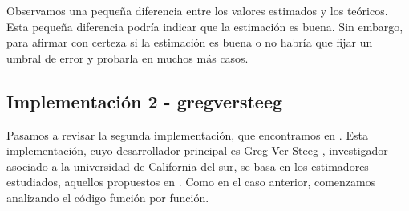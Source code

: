 \documentclass[12pt,a4paper]{report} %
\theoremstyle{definition}
\begin{document}
Observamos una pequeña diferencia entre los valores estimados y los teóricos. Esta pequeña diferencia podría indicar que la estimación es buena. Sin embargo, para afirmar con certeza si la estimación es buena o no habría que fijar un umbral de error y probarla en muchos más casos.\\ 

\subsection{Implementación 2 -  gregversteeg}

Pasamos a revisar la segunda implementación, que encontramos en \cite{npeet}. Esta implementación, cuyo desarrollador principal es Greg Ver Steeg \cite{gregv}, investigador asociado a la universidad de California del sur, se basa en los estimadores estudiados, aquellos propuestos en \cite{kraskov}. Como en el caso anterior, comenzamos analizando el código función por función. 
\end{document}
